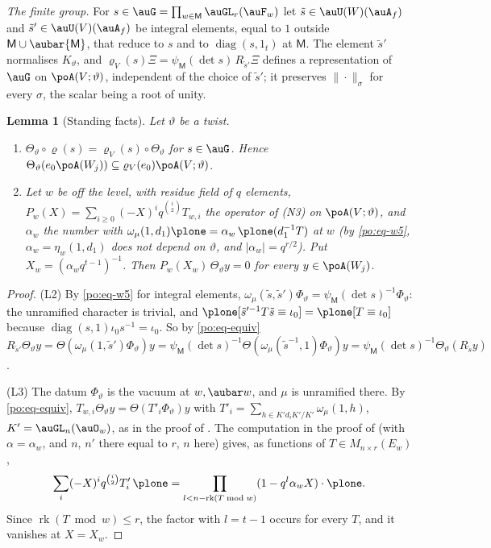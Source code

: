 \documentclass[10pt]{amsart}
\newtheorem{lemma}[theorem]{Lemma}
\theoremstyle{definition}
\theoremstyle{remark}
\begin{document}
\emph{The finite group.} For $s\in\auG=\prod_{w\in\mathsf M}\auGL_r(\auF_w)$ let $\tilde s\in
\auU(W)(\auA_f)$ and $\tilde s'\in\auU(V)(\auA_f)$ be integral elements, equal to $1$ outside
$\mathsf M\cup\aubar{\mathsf M}$, that reduce to $s$ and to $\operatorname{diag}(s,1_t)$ at
$\mathsf M$. The element $\tilde s'$ normalises $K_\vartheta$, and
$\varrho_V(s)\Xi=\psi_{\mathsf M}(\det s)\,R_{\tilde s'}\Xi$ defines a representation of $\auG$ on
$\poA(V;\vartheta)$, independent of the choice of $\tilde s'$; it preserves $\|\cdot\|_\sigma$ for
every $\sigma$, the scalar being a root of unity.

\begin{lemma}[Standing facts]\label{po:facts}
Let $\vartheta$ be a twist.
\begin{enumerate}
\item[(L2)] $\Theta_\vartheta\circ\varrho(s)=\varrho_V(s)\circ\Theta_\vartheta$ for $s\in\auG$.
Hence $\Theta_\vartheta(e_0\poA(W_j))\subseteq\varrho_V(e_0)\poA(V;\vartheta)$.
\item[(L3)] Let $w$ be off the level, with residue field of $q$ elements, $P_w(X)=\sum_{i\ge0}
(-X)^iq^{\binom i2}T_{w,i}$ the operator of (N3) on $\poA(V;\vartheta)$, and $\alpha_w$ the number
with $\omega_\mu(1,d_1)\plone=\alpha_w\,\plone(d_1^{-1}T)$ at $w$ (by \eqref{po:eq-w5}, $\alpha_w=\eta_w(1,d_1)$ does not depend on $\vartheta$, and
$|\alpha_w|=q^{r/2}$). Put $X_w=(\alpha_wq^{t-1})^{-1}$. Then $P_w(X_w)\,\Theta_\vartheta y=0$ for
every $y\in\poA(W_j)$.
\end{enumerate}
\end{lemma}
\begin{proof}
(L2) By \eqref{po:eq-w5} for integral elements, $\omega_\mu(\tilde s,\tilde s')\Phi_\vartheta=
\psi_{\mathsf M}(\det s)^{-1}\Phi_\vartheta$: the unramified character is trivial, and
$\plone[\tilde s'^{-1}T\tilde s\equiv\iota_0]=\plone[T\equiv\iota_0]$ because
$\operatorname{diag}(s,1)\iota_0s^{-1}=\iota_0$. So by \eqref{po:eq-equiv}
$R_{\tilde s'}\Theta_\vartheta y=\Theta(\omega_\mu(1,\tilde s')\Phi_\vartheta)y=\psi_{\mathsf M}
(\det s)^{-1}\Theta(\omega_\mu(\tilde s^{-1},1)\Phi_\vartheta)y=\psi_{\mathsf M}(\det s)^{-1}
\Theta_\vartheta(R_{\tilde s}y)$.

(L3) The datum $\Phi_\vartheta$ is the vacuum at $w,\aubar w$, and $\mu$ is unramified there. By
\eqref{po:eq-equiv}, $T_{w,i}\Theta_\vartheta y=\Theta(T'_i\Phi_\vartheta)y$ with $T'_i=\sum_{h\in
K'd_iK'/K'}\omega_\mu(1,h)$, $K'=\auGL_n(\auO_w)$, as in the proof of {\cite[Proposition~6.9]{P49}}.
The computation in the proof of {\cite[Lemma~6.8]{P49}} (with $\alpha=\alpha_w$, and $n$, $n'$ there
equal to $r$, $n$ here) gives, as functions of $T\in M_{n\times r}(E_w)$,
\[
\sum_i(-X)^iq^{\binom i2}T'_i\,\plone=\prod_{l<n-\operatorname{rk}(T\bmod w)}(1-q^l\alpha_wX)\cdot
\plone .
\]
Since $\operatorname{rk}(T\bmod w)\le r$, the factor with $l=t-1$ occurs for every $T$, and it
vanishes at $X=X_w$.
\end{proof}
\end{document}
